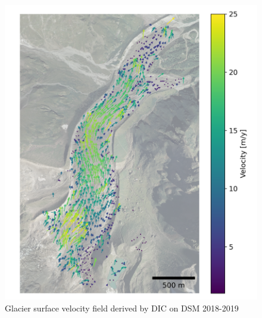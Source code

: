 \begin{figure}
    \centering
    \includegraphics[height=\textheight]{figures/chapter3/velocity_DIC_2018-2019.png}
    \caption{Glacier surface velocity field derived by DIC on DSM 2018-2019}
\end{figure}

